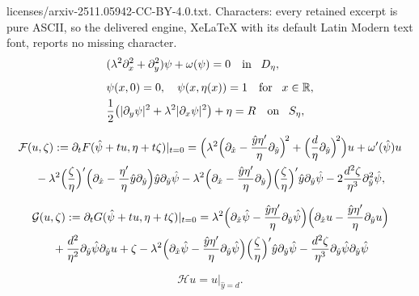 \documentclass[10pt,a4paper]{amsart}
\begin{document}
licenses/arxiv-2511.05942-CC-BY-4.0.txt. Characters: every retained excerpt is pure ASCII, so the delivered engine, XeLaTeX with its default Latin Modern text font, reports no missing character.
\begin{equation}\label{Okt31a}
\begin{aligned}
&(\lambda^2\partial_x^2+\partial_y^2)\psi+\omega(\psi)=0\quad\mbox{in\!}\quad D_\eta,\\[1.5mm]
&\psi(x,0)=0,\quad\psi(x,\eta(x))=1\quad\mbox{for\!}\quad x\in\mathbb{R},\\
&\frac{1}{2}\bigl(|\partial_y\psi|^2+\lambda^2|\partial_x\psi|^2\bigr)+\eta=R\quad\mbox{on\!}\quad S_\eta,
\end{aligned}
\end{equation}

\begin{multline}\label{Ju28a}
\mathcal{F}(u,\zeta):=\partial_{t}F(\hat{\psi}+tu,\eta+t\zeta)|_{t=0}=\Bigl(\lambda^2\Bigl(\partial_{\hat{x}}-\frac{\hat{y}\eta'}{\eta}\partial_{\hat{y}}\Bigr)^{\!2}
+\Bigl(\frac{d}{\eta}\partial_{\hat{y}}\Bigr)^{\!2}\Bigr)u+\omega'(\hat{\psi})u\\
{}-\lambda^2\Bigl(\frac{\zeta}{\eta}\Bigr)'\Bigl(\partial_{\hat{x}}-\frac{\eta'}{\eta}{\hat{y}}\partial_{\hat{y}}\Bigr)\hat{y}\partial_{\hat{y}}\hat{\psi}
-\lambda^2\Bigl(\partial_{\hat{x}}-\frac{\hat{y}\eta'}{\eta}\partial_{\hat{y}}\Bigr)\Bigl(\frac{\zeta}{\eta}\Bigr)'\hat{y}\partial_{\hat{y}}\hat{\psi}
-2\frac{d^2\zeta}{\eta^3}\partial_{\hat{y}}^2\hat{\psi},
\end{multline}

\begin{multline}\label{Ju28aa}
\mathcal{G}(u,\zeta):=\partial_tG(\hat{\psi}+tu,\eta+t\zeta)|_{t=0}=\lambda^2\Bigl(\partial_{\hat{x}}\hat{\psi}-\frac{\hat{y}\eta'}{\eta}\partial_{\hat{y}}\hat{\psi}\Bigr)\Bigl(\partial_{\hat{x}}u
-\frac{\hat{y}\eta'}{\eta}\partial_{\hat{y}}u\Bigr)\\
{}+\frac{d^2}{\eta^2}\partial_{\hat{y}}\hat{\psi}\partial_{\hat{y}}u+\zeta
-\lambda^2\Bigl(\partial_{\hat{x}}\hat{\psi}-\frac{\hat{y}\eta'}{\eta}\partial_{\hat{y}}\hat{\psi}\Bigr)\Bigl(\frac{\zeta}{\eta}\Bigr)'\hat{y}\partial_{\hat{y}}\hat{\psi}
-\frac{d^2\zeta}{\eta^3}\partial_{\hat{y}}\hat{\psi}\partial_{\hat{y}}\hat{\psi}
\end{multline}

\begin{equation}\label{Ju28ab}
\mathcal{H}u=u|_{\hat{y}=d}.
\end{equation}
\end{document}
